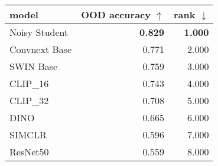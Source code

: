 \begin{tabular}{lrr}
\toprule
        model & OOD accuracy $\uparrow$ & rank $\downarrow$ \\
\midrule
Noisy Student &          \textbf{0.829} &    \textbf{1.000} \\
Convnext Base &                   0.771 &             2.000 \\
    SWIN Base &                   0.759 &             3.000 \\
     CLIP\_16 &                   0.743 &             4.000 \\
     CLIP\_32 &                   0.708 &             5.000 \\
         DINO &                   0.665 &             6.000 \\
       SIMCLR &                   0.596 &             7.000 \\
     ResNet50 &                   0.559 &             8.000 \\
\bottomrule
\end{tabular}

